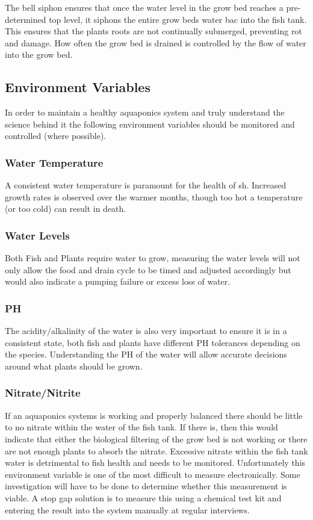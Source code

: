 \documentclass[11pt, oneside, a4paper, titlepage]{article}
\begin{document}
The bell siphon ensures that once the water level in the grow bed reaches a pre-determined top level, it siphons the entire grow beds water bac into the fish tank. This ensures that the plants roots are not continually submerged, preventing rot and damage. How often the grow bed is drained is controlled by the flow of water into the grow bed.  
\subsection{Environment Variables}
In order to maintain a healthy aquaponics system and truly understand the science behind it the following environment variables should be monitored and controlled (where possible). 

\subsubsection{Water Temperature}
A consistent water temperature is paramount for the health of sh. Increased growth rates is observed over the warmer months, though too hot a temperature (or too cold) can result in death. 

\subsubsection{Water Levels}
Both Fish and Plants require water to grow, measuring the water levels will not only allow the food and drain cycle to be timed and adjusted accordingly but would also indicate a pumping failure or excess loss of water. 

\subsubsection{PH}
The acidity/alkalinity of the water is also very important to ensure it is in a consistent state, both fish and plants have different PH tolerances depending on the species. Understanding the PH of the water will allow accurate decisions around what plants should be grown. 

\subsubsection{Nitrate/Nitrite}
If an aquaponics systems is working and properly balanced there should be little to no nitrate within the water of the fish tank. If there is, then this would indicate that either the biological filtering of the grow bed is not working or there are not enough plants to absorb the nitrate. Excessive nitrate within the fish tank water is detrimental to fish health and needs to be monitored. Unfortunately this environment variable is one of the most difficult to measure electronically. Some investigation will have to be done to determine whether this measurement is viable. A stop gap solution is to measure this using a chemical test kit and entering the result into the system manually at regular interviews. 
\end{document}
